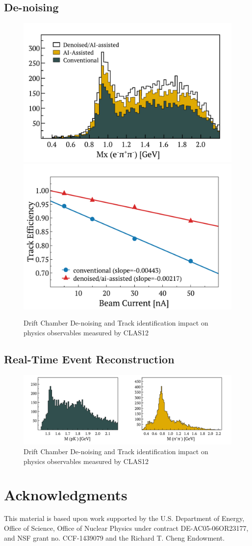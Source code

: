 \documentclass[preprint,12pt]{elsarticle}
\begin{document}
\subsection{De-noising}

\begin{figure}[h!]
\centering
\includegraphics[width=0.44\columnwidth]{images/figure_denoise_mxp.pdf}
\includegraphics[width=0.42\columnwidth]{images/luminosity_scan.pdf}
\caption{Drift Chamber De-noising and Track identification impact on physics observables measured by CLAS12} 
\label{fig:drift_chambers_denoise}
\end{figure}

\subsection{Real-Time Event Reconstruction}

\begin{figure}[h!]
\centering
\includegraphics[width=0.88\columnwidth]{images/figure_lambda_instarec.pdf}

\caption{Drift Chamber De-noising and Track identification impact on physics observables measured by CLAS12} 
\label{fig:drift_chambers_instarec}
\end{figure}

\section{Acknowledgments}
This material is based upon work supported by the U.S. Department of Energy, Office of Science, Office of Nuclear Physics under contract DE-AC05-06OR23177, and NSF grant no. CCF-1439079 and the Richard T. Cheng Endowment. 
 
%
%
\end{document}
